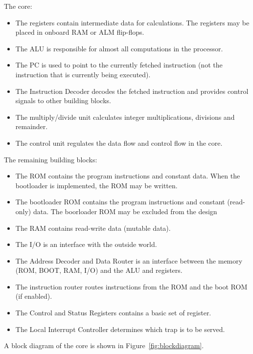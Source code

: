 \documentclass[12pt]{article}
\begin{document}
The core:
\begin{itemize}
\item The registers contain intermediate data for calculations. The registers may be placed in onboard RAM or ALM flip-flops.
\item The ALU is responsible for almost all computations in the processor.
\item The PC is used to point to the currently fetched instruction (not the instruction that is currently being executed).
\item The Instruction Decoder decodes the fetched instruction and provides control signals to other building blocks.
\item The multiply/divide unit calculates integer multiplications, divisions and remainder.
\item The control unit regulates the data flow and control flow in the core.
\end{itemize}

The remaining building blocks:
\begin{itemize}
\item The ROM contains the program instructions and constant data. When the bootloader is implemented, the ROM may be written.
\item The bootloader ROM contains the program instructions and constant (read-only) data. The boorloader ROM may be excluded from the design
\item The RAM contains read-write data (mutable data).
\item The I/O is an interface with the outside world.
\item The Address Decoder and Data Router is an interface between the memory (ROM, BOOT, RAM, I/O) and the ALU and registers.
\item The instruction router routes instructions from the ROM and the boot ROM (if enabled).
\item The Control and Status Registers contains a basic set of register.
\item The Local Interrupt Controller determines which trap is to be served.
\end{itemize}

A block diagram of the core is shown in Figure~\ref{fig:blockdiagram}.
\end{document}
